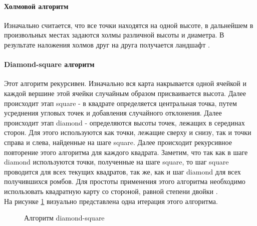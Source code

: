 \documentclass{article}
\begin{document}
	\paragraph{ Холмовой алгоритм }
	\indent Изначально считается, что все точки находятся на одной высоте, в дальнейшем в произвольных местах задаются холмы различной высоты и диаметра. В результате наложения холмов друг на друга получается ландшафт \cite{hillAlg}.
	\paragraph{ Diamond-square алгоритм }
	Этот алгоритм рекурсивен. Изначально вся карта накрывается одной ячейкой и каждой вершине этой ячейки случайным образом присваивается высота. Далее происходит этап square - в квадрате определяется центральная точка, путем усреднения угловых точек и добавления случайного отклонения. Далее происходит этап diamond - определяются высоты точек, лежащих в серединах сторон. Для этого используются как точки, лежащие сверху и снизу, так и точки справа и слева, найденные на шаге square. Далее происходит рекурсивное повторение этого алгоритма для каждого квадрата. Заметим, что так как в шаге diamond используются точки, полученные на шаге square, то шаг square проводится для всех текущих квадратов, так же, как и шаг diamond для всех получившихся ромбов. Для простоты применения этого алгоритма необходимо использовать квадратную карту со стороной, равной степени двойки \cite{diamond-square}.
	\\ \indent На рисунке \hyperref[diamondSquareDemonstrationSchema]{\ref{diamondSquareDemonstrationSchema}} визуально представлена одна итерация этого алгоритма.
	\begin{figure}[H]
		 	\caption{Алгоритм diamond-square}
		 	\label{diamondSquareDemonstrationSchema}
	 	\end{figure}
\end{document}
